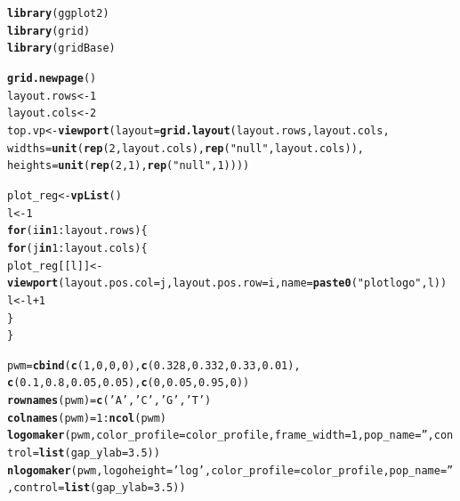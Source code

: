 \documentclass[12pt]{article}\usepackage[]{graphicx}\usepackage[usenames,dvipsnames]{color}
\makeatletter
\newcommand{\hlnum}[1]{\textcolor[rgb]{0.686,0.059,0.569}{#1}}%
\newcommand{\hlstr}[1]{\textcolor[rgb]{0.192,0.494,0.8}{#1}}%
\newcommand{\hlopt}[1]{\textcolor[rgb]{0,0,0}{#1}}%
\newcommand{\hlstd}[1]{\textcolor[rgb]{0.345,0.345,0.345}{#1}}%
\newcommand{\hlkwa}[1]{\textcolor[rgb]{0.161,0.373,0.58}{\textbf{#1}}}%
\newcommand{\hlkwb}[1]{\textcolor[rgb]{0.69,0.353,0.396}{#1}}%
\newcommand{\hlkwc}[1]{\textcolor[rgb]{0.333,0.667,0.333}{#1}}%
\newcommand{\hlkwd}[1]{\textcolor[rgb]{0.737,0.353,0.396}{\textbf{#1}}}%
\newenvironment{kframe}{%
 \def\at@end@of@kframe{}%
 \ifinner\ifhmode%
  \def\at@end@of@kframe{\end{minipage}}%
  \begin{minipage}{\columnwidth}%
 \fi\fi%
 \def\FrameCommand##1{\hskip\@totalleftmargin \hskip-\fboxsep
 \colorbox{shadecolor}{##1}\hskip-\fboxsep
     \hskip-\linewidth \hskip-\@totalleftmargin \hskip\columnwidth}%
 \MakeFramed {\advance\hsize-\width
   \@totalleftmargin\z@ \linewidth\hsize
   \@setminipage}}%
 {\par\unskip\endMakeFramed%
 \at@end@of@kframe}
\newenvironment{knitrout}{}{} %
\makeatother
\begin{document}
\begin{knitrout}
\color{fgcolor}\begin{kframe}
\begin{alltt}
\hlkwd{library}\hlstd{(ggplot2)}
\hlkwd{library}\hlstd{(grid)}
\hlkwd{library}\hlstd{(gridBase)}


\hlkwd{grid.newpage}\hlstd{()}
\hlstd{layout.rows} \hlkwb{<-} \hlnum{1}
\hlstd{layout.cols} \hlkwb{<-} \hlnum{2}
\hlstd{top.vp} \hlkwb{<-} \hlkwd{viewport}\hlstd{(}\hlkwc{layout}\hlstd{=}\hlkwd{grid.layout}\hlstd{(layout.rows, layout.cols,}
                                      \hlkwc{widths}\hlstd{=}\hlkwd{unit}\hlstd{(}\hlkwd{rep}\hlstd{(}\hlnum{2}\hlstd{,layout.cols),} \hlkwd{rep}\hlstd{(}\hlstr{"null"}\hlstd{, layout.cols)),}
                                      \hlkwc{heights}\hlstd{=}\hlkwd{unit}\hlstd{(}\hlkwd{rep}\hlstd{(}\hlnum{2}\hlstd{,}\hlnum{1}\hlstd{),} \hlkwd{rep}\hlstd{(}\hlstr{"null"}\hlstd{,}\hlnum{1}\hlstd{))))}

\hlstd{plot_reg} \hlkwb{<-} \hlkwd{vpList}\hlstd{()}
\hlstd{l} \hlkwb{<-} \hlnum{1}
\hlkwa{for}\hlstd{(i} \hlkwa{in} \hlnum{1}\hlopt{:}\hlstd{layout.rows)\{}
  \hlkwa{for}\hlstd{(j} \hlkwa{in} \hlnum{1}\hlopt{:}\hlstd{layout.cols)\{}
    \hlstd{plot_reg[[l]]} \hlkwb{<-} \hlkwd{viewport}\hlstd{(}\hlkwc{layout.pos.col} \hlstd{= j,} \hlkwc{layout.pos.row} \hlstd{= i,} \hlkwc{name} \hlstd{=} \hlkwd{paste0}\hlstd{(}\hlstr{"plotlogo"}\hlstd{, l))}
    \hlstd{l} \hlkwb{<-} \hlstd{l}\hlopt{+}\hlnum{1}
  \hlstd{\}}
\hlstd{\}}

\hlstd{pwm}\hlkwb{=}\hlkwd{cbind}\hlstd{(}\hlkwd{c}\hlstd{(}\hlnum{1}\hlstd{,}\hlnum{0}\hlstd{,}\hlnum{0}\hlstd{,}\hlnum{0}\hlstd{),}\hlkwd{c}\hlstd{(}\hlnum{0.328}\hlstd{,}\hlnum{0.332}\hlstd{,}\hlnum{0.33}\hlstd{,}\hlnum{0.01}\hlstd{),}
          \hlkwd{c}\hlstd{(}\hlnum{0.1}\hlstd{,}\hlnum{0.8}\hlstd{,}\hlnum{0.05}\hlstd{,}\hlnum{0.05}\hlstd{),}\hlkwd{c}\hlstd{(}\hlnum{0}\hlstd{,}\hlnum{0.05}\hlstd{,}\hlnum{0.95}\hlstd{,}\hlnum{0}\hlstd{))}
\hlkwd{rownames}\hlstd{(pwm)}\hlkwb{=}\hlkwd{c}\hlstd{(}\hlstr{'A'}\hlstd{,}\hlstr{'C'}\hlstd{,}\hlstr{'G'}\hlstd{,}\hlstr{'T'}\hlstd{)}
\hlkwd{colnames}\hlstd{(pwm)}\hlkwb{=}\hlnum{1}\hlopt{:}\hlkwd{ncol}\hlstd{(pwm)}
\hlkwd{logomaker}\hlstd{(pwm,}\hlkwc{color_profile}\hlstd{=color_profile,}\hlkwc{frame_width} \hlstd{=} \hlnum{1}\hlstd{,}\hlkwc{pop_name} \hlstd{=} \hlstr{''}\hlstd{,}\hlkwc{control} \hlstd{=} \hlkwd{list}\hlstd{(}\hlkwc{gap_ylab}\hlstd{=}\hlnum{3.5}\hlstd{))}
\hlkwd{nlogomaker}\hlstd{(pwm,}\hlkwc{logoheight} \hlstd{=} \hlstr{'log'}\hlstd{,}\hlkwc{color_profile} \hlstd{= color_profile,}\hlkwc{pop_name} \hlstd{=} \hlstr{''}\hlstd{,}\hlkwc{control} \hlstd{=} \hlkwd{list}\hlstd{(}\hlkwc{gap_ylab}\hlstd{=}\hlnum{3.5}\hlstd{))}
\end{alltt}
\end{kframe}
\end{knitrout}
\end{document}
